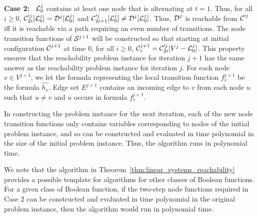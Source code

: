 \noindent
\textbf{Case 2:}~
$\mbox{$\mathcal{L}$}_0^j$ contains at least one node that is alternating at $t =1$.
Thus, for all $i \geq 0$,
$\mbox{$\mathcal{C}$}'^j_{2i}[\mbox{$\mathcal{L}$}_0^j] = \mbox{$\mathcal{D}$}^j[\mbox{$\mathcal{L}$}_0^j]$
and $\mbox{$\mathcal{C}$}'^j_{2i+1}[\mbox{$\mathcal{L}$}_0^j] \neq \mbox{$\mathcal{D}$}^j[\mbox{$\mathcal{L}$}_0^j]$.
Thus, $\mbox{$\mathcal{D}$}^j$ is reachable from $\mbox{$\mathcal{C}$}'^j$ iff
it is reachable via a path requiring an even number of transitions.
The node transition functions of $\mbox{$\mathcal{S}$}{}^{j+1}$ will be constructed so that 
starting at initial configuration $\mbox{$\mathcal{C}$}^{j+1}$ at time 0,
for all $ i \geq 0$,
$\mbox{$\mathcal{C}$}^{j+1}_i = \mbox{$\mathcal{C}$}'^j_{2i}[V^j -\mbox{$\mathcal{L}$}_0^j]$.
This property ensures that the reachability problem instance for iteration $j+1$
has the same answer as the reachability problem instance for iteration $j$.
For each node $v \in V^{j+1}$,
we let the formula representing the local transition function $f^{j+1}_v$ 
be the formula $\hat{h_v}$.
Edge set $E^{j+1}$ contains an incoming edge to $v$ from each node $u$
such that $u \neq v$ and $u$ occurs in formula $f^{j+1}_v$.

In constructing the problem instance for the next iteration,
each of the new node transition functions only contains variables
corresponding to nodes of the initial problem instance,
and so can be constructed and evaluated in time polynomial in
the size of the initial problem instance.
Thus, the algorithm runs in polynomial time.
\QED

We note that the algorithm in Theorem~\ref{thm:linear_systems_reachability} 
provides a possible template
for algorithms for other classes of Boolean functions.
For a given class of Boolean function,
if the two-step node functions required in Case 2 can be constructed and evaluated in time polynomial
in the original problem instance,
then the algorithm would run in polynomial time.
